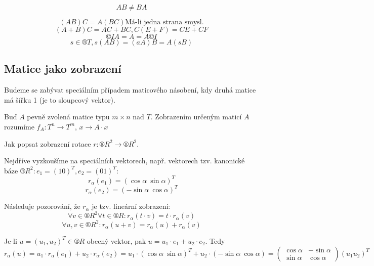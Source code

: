 \documentclass[12pt]{article}					%
\begin{document}
        \begin{poznamka}
            \begin{upozorneni}
                $$ AB ≠ BA $$
            \end{upozorneni}
            $$ (AB)C = A(BC) \text{Má-li jedna strana smysl.} $$
            $$ (A+B)C = AC + BC, C(E+F) = CE + CF $$ 
            $$ ©IA = A = A©I $$ 
            $$ s\in ®T, s(AB) = (aA)B = A(sB) $$ 
        \end{poznamka}


    \subsection{Matice jako zobrazení}
        Budeme se zabývat speciálním případem maticového násobení, kdy druhá matice má šířku 1 (je to sloupcový vektor).

        \begin{definice}
            Buď $A$ pevně zvolená matice typu $m\times n$ nad $T$. Zobrazením určeným maticí $A$ rozumíme $f_A : T^n \rightarrow T^m$, $x \rightarrow A · x$
        \end{definice}

        \begin{priklad}
            Jak popsat zobrazení rotace $r: ®R^2 \rightarrow ®R^2$.
            \begin{reseni}
                Nejdříve vyzkoušíme na speciálních vektorech, např. vektorech tzv. kanonické báze $®R^2: e_1 = (1 0)^T, e_2 = (0 1)^T$:
                $$ r_\alpha(e_1) = (\cos\alpha\ \sin\alpha)^T $$ 
                $$ r_\alpha(e_2) = (-\sin\alpha\ \cos\alpha)^T $$ 

                Následuje pozorování, že $r_\alpha$ je tzv. lineární zobrazení:
                $$ \forall v \in ®R^2 \forall t \in ®R: r_\alpha(t·v) = t·r_\alpha(v) $$
                $$ \forall u, v \in ®R^2: r_\alpha(u+v) = r_\alpha(u) + r_\alpha(v) $$ 

                Je-li $u = (u_1, u_2)^T \in ®R$ obecný vektor, pak $u = u_1·e_1 + u_2·e_2$. Tedy $r_\alpha(u) = u_1·r_\alpha(e_1) + u_2·r_\alpha(e_2) = u_1·(\cos\alpha\ \sin\alpha)^T + u_2·(-\sin\alpha\ \cos\alpha) =\begin{pmatrix} \cos\alpha & -\sin\alpha\\ \sin\alpha & \cos\alpha \end{pmatrix} (u_1 u_2)^T$
            \end{reseni}
        \end{priklad}
\end{document}
